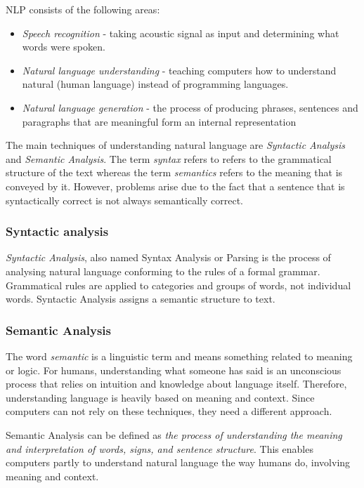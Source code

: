 \documentclass[12pt,a4paper]{article}
\begin{document}
NLP consists of the following areas:
\begin{itemize}
    \item \textit{Speech recognition} - taking acoustic signal as input and determining what words were spoken.
    \item \textit{Natural language understanding} - teaching computers how to understand natural (human language) instead of programming languages.
    \item \textit{Natural language generation} - the process of producing phrases, sentences and paragraphs that are meaningful form an internal representation \cite{Khurana2017}
\end{itemize}

The main techniques of understanding natural language are \textit{Syntactic Analysis} and \textit{Semantic Analysis}. The term \textit{syntax} refers to refers to the grammatical structure of the text whereas the term \textit{semantics} refers to the meaning that is conveyed by it. However, problems arise due to the fact that a sentence that is syntactically correct is not always semantically correct.

\subsubsection{Syntactic analysis}
\textit{Syntactic Analysis}, also named Syntax Analysis or Parsing is the process of analysing natural language conforming to the rules of a formal grammar. Grammatical rules are applied to categories and groups of words, not individual words. Syntactic Analysis assigns a semantic structure to text.

\subsubsection{Semantic Analysis}
The word \textit{semantic} is a linguistic term and means something related to meaning or logic.
For humans, understanding what someone has said is an unconscious process that relies on intuition and knowledge about language itself. Therefore, understanding language is heavily based on meaning and context. Since computers can not rely on these techniques, they need a different approach.

Semantic Analysis can be defined as \textit{the process of understanding the meaning and interpretation of words, signs, and sentence structure}. This enables computers partly to understand natural language the way humans do, involving meaning and context.
\end{document}
